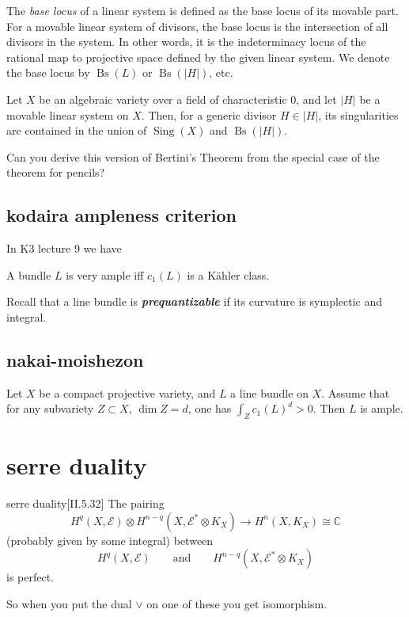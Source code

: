 The \emph{base locus} of a linear system is defined as the base locus of its movable part. For a movable linear system of divisors, the base locus is the intersection of all divisors in the system. In other words, it is the indeterminacy locus of the rational map to projective space defined by the given linear system. We denote the base locus by \( \operatorname{Bs}(L) \) or \( \operatorname{Bs}(|H|) \), etc.

\begin{thm}[Bertini]
Let \( X \) be an algebraic variety over a field of characteristic 0, and let \( |H| \) be a movable linear system on \( X \). Then, for a generic divisor \( H \in |H| \), its singularities are contained in the union of \( \operatorname{Sing}(X) \) and \( \operatorname{Bs}(|H|) \).
\end{thm}

\begin{exercise}
Can you derive this version of Bertini’s Theorem from the special case of the theorem for pencils?
\end{exercise}

\subsection{kodaira ampleness criterion}

In K3 lecture 9 we have

\begin{thm}[Kodaira]\leavevmode
A bundle \(L\) is very ample iff \(c_1(L)\) is a Kähler class.
\end{thm}

\begin{thing7}{Recall}\leavevmode
that a line bundle is \textit{\textbf{prequantizable}} if its curvature is symplectic and integral.
\end{thing7}

\subsection{nakai-moishezon}

\begin{thm}\leavevmode
Let \(X\) be a compact projective variety, and \(L\) a line bundle on \(X\). Assume that for any subvariety \(Z \subset X\), \(\dim Z=d\), one has \(\int_Z c_1(L)^d>0\). Then \(L\) is ample.
\end{thm}

\section{serre duality}
\begin{thing6}{serre duality}[II.5.32\cite{voi}]\label{thm:5.32}\leavevmode
The pairing
\[H^{q}(X,\mathcal{E})\otimes H^{n-q}(X,\mathcal{E}^*\otimes K_X)\to H^{n}(X,K_X)\cong\mathbb{C}\]
(probably given by some integral) between
\[H^{q}(X,\mathcal{E})\qquad \text{and} \qquad H^{n-q}(X,\mathcal{E}^* \otimes K_X)\]
is perfect.
\end{thing6}
So when you put the dual \(\vee\) on one of these you get isomorphism.


